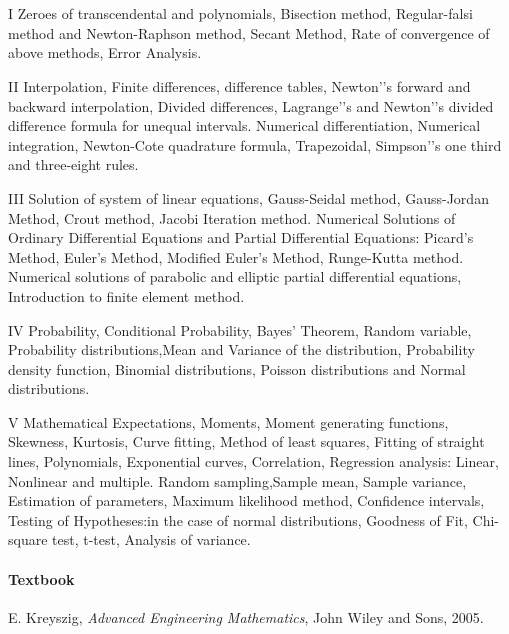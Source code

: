 \section{\courseinfo}


\unit{I} Zeroes of transcendental and polynomials, Bisection method, Regular-falsi method and Newton-Raphson method, Secant Method, Rate of convergence of above methods, Error Analysis.

\unit{II} 
Interpolation, Finite differences, difference tables, Newton'’s forward and backward interpolation, Divided differences, Lagrange'’s and Newton'’s divided difference formula for unequal intervals. Numerical differentiation, Numerical integration, Newton-Cote quadrature formula, Trapezoidal, Simpson'’s one third and three-eight rules. 

\unit{III}
Solution of system of linear equations, Gauss-Seidal method, Gauss-Jordan Method, Crout method, Jacobi Iteration method.
Numerical Solutions of Ordinary Differential Equations and Partial Differential Equations: Picard's Method, Euler's Method, Modified Euler's Method, Runge-Kutta
method. Numerical solutions of parabolic and elliptic partial differential equations, Introduction to finite element method.

\unit{IV}
Probability, Conditional Probability, Bayes' Theorem, Random variable, Probability distributions,Mean and Variance of the distribution, Probability density function, Binomial distributions, Poisson distributions and Normal distributions.

\unit{V}
Mathematical Expectations, Moments, Moment generating functions, Skewness, Kurtosis, Curve fitting, Method of least squares, Fitting of straight lines, Polynomials, Exponential curves, Correlation, Regression analysis: Linear, Nonlinear and multiple. Random sampling,Sample mean, Sample variance, Estimation of parameters, Maximum likelihood method, Confidence intervals, Testing of Hypotheses:in the case of normal distributions, Goodness of Fit, Chi-square test, t-test, Analysis of variance.
 
\paragraph{Textbook}
 E. Kreyszig, \emph{Advanced Engineering Mathematics}, John Wiley and Sons, 2005.



